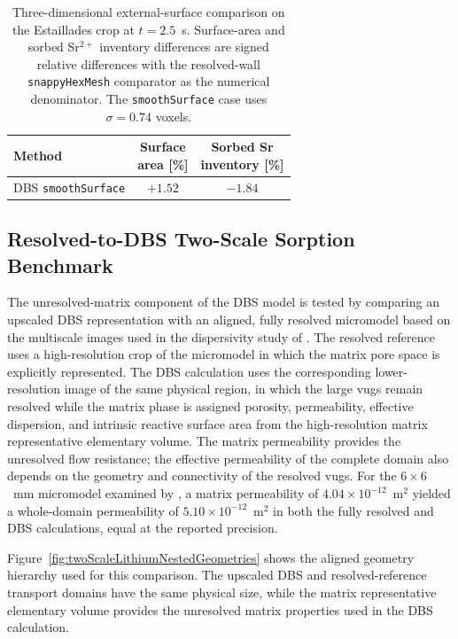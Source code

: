 \begin{table}[htbp]
    \centering
    \caption{Three-dimensional external-surface comparison on the Estaillades
    crop at $t = 2.5$~s. Surface-area and sorbed Sr$^{2+}$ inventory
    differences are signed relative differences with the resolved-wall
    \texttt{snappyHexMesh} comparator as the numerical denominator. The
    \texttt{smoothSurface} case uses $\sigma = 0.74$ voxels.}
    \label{tab:external3DValidation}
    \begin{tabular}{lcc}
        \toprule
        Method & \shortstack{Surface\\area [\%]} & \shortstack{Sorbed Sr\\inventory [\%]} \\
        \midrule
        DBS \texttt{smoothSurface} & $+1.52$ & $-1.84$ \\
        \bottomrule
    \end{tabular}
\end{table}

\FloatBarrier

\subsection{Resolved-to-DBS Two-Scale Sorption Benchmark}

The unresolved-matrix component of the DBS model is tested by comparing an
upscaled DBS representation with an aligned, fully resolved micromodel based on
the multiscale images used in the dispersivity study of
\citet{maes2024dispersivity}. The resolved reference uses a high-resolution
crop of the micromodel in which the matrix pore space is explicitly
represented. The DBS calculation uses the corresponding lower-resolution
image of the same physical region, in which the large vugs remain resolved
while the matrix phase is assigned porosity, permeability, effective
dispersion, and intrinsic reactive surface area from the high-resolution
matrix representative elementary volume. The matrix permeability provides
the unresolved flow resistance; the effective permeability of the complete
domain also depends on the geometry and connectivity of the resolved vugs.
For the $6\times6$~mm micromodel examined by
\citet{maes2024dispersivity}, a matrix permeability of
$4.04\times10^{-12}$~$\mathrm{m^2}$ yielded a whole-domain permeability of
$5.10\times10^{-12}$~$\mathrm{m^2}$ in both the fully resolved and DBS
calculations, equal at the reported precision.

Figure~\ref{fig:twoScaleLithiumNestedGeometries} shows the aligned geometry
hierarchy used for this comparison. The upscaled DBS and resolved-reference
transport domains have the same physical size, while the matrix representative
elementary volume provides the unresolved matrix properties used in the DBS
calculation.

